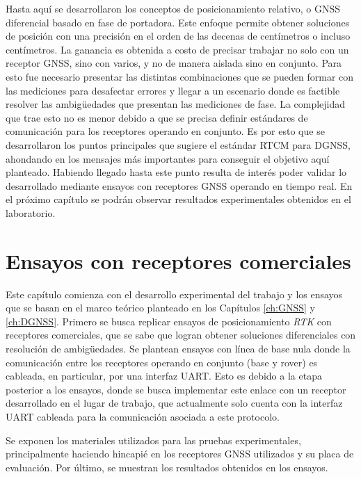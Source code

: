 \documentclass[a4paper,12pt,oneside,onecolumn,final,openright]{book}%
\begin{document}
	Hasta aquí se desarrollaron los conceptos de posicionamiento relativo, o GNSS diferencial basado en fase de portadora. Este enfoque permite obtener soluciones de posición con una precisión en el orden de las decenas de centímetros o incluso centímetros. La ganancia es obtenida a costo de precisar trabajar no solo con un receptor GNSS, sino con varios, y no de manera aislada sino en conjunto. Para esto fue necesario presentar las distintas combinaciones que se pueden formar con las mediciones para desafectar errores y llegar a un escenario donde es factible resolver las ambigüedades que presentan las mediciones de fase. La complejidad que trae esto no es menor debido a que se precisa definir estándares de comunicación para los receptores operando en conjunto. Es por esto que se desarrollaron los puntos principales que sugiere el estándar RTCM para DGNSS, ahondando en los mensajes más importantes para conseguir el objetivo aquí planteado. Habiendo llegado hasta este punto resulta de interés poder validar lo desarrollado mediante ensayos con receptores GNSS operando en tiempo real. En el próximo capítulo se podrán observar resultados experimentales obtenidos en el laboratorio.
\chapter{Ensayos con receptores comerciales}\label{ch:ublox}
	Este capítulo comienza con el desarrollo experimental del trabajo y los ensayos que se basan en el marco teórico planteado en los Capítulos \ref{ch:GNSS} y \ref{ch:DGNSS}. Primero se busca replicar ensayos de posicionamiento \textit{RTK} con receptores comerciales, que se sabe que logran obtener soluciones diferenciales con resolución de ambigüedades. Se plantean ensayos con línea de base nula donde la comunicación entre los receptores operando en conjunto (base y rover) es cableada, en particular, por una interfaz UART. Esto es debido a la etapa posterior a los ensayos, donde se busca implementar este enlace con un receptor desarrollado en el lugar de trabajo, que actualmente solo cuenta con la interfaz UART cableada para la comunicación asociada a este protocolo. 
	
	Se exponen los materiales utilizados para las pruebas experimentales, principalmente haciendo hincapié en los receptores GNSS utilizados y su placa de evaluación. Por último, se muestran los resultados obtenidos en los ensayos.

\end{document}
